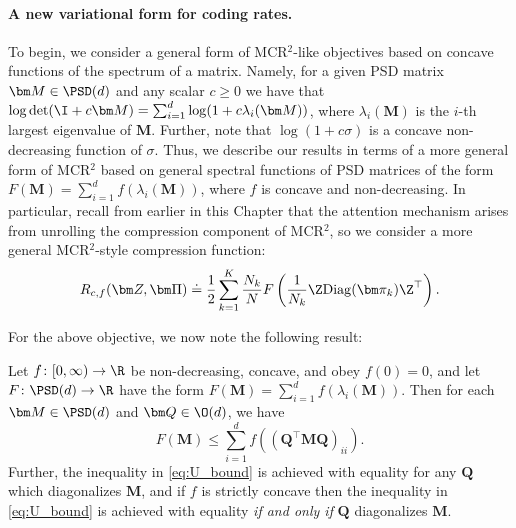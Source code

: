 \documentclass[../../book-main.tex]{subfiles}
\begin{document}
\paragraph{A new variational form for coding rates.} To begin, we
consider a general form of MCR$^2$-like objectives based on concave
functions of the spectrum of a matrix.  Namely, for a given PSD
matrix $\bm M \in \PSD(d)$ and any scalar $c \geq 0$ we have that
$\log \det (\I + c \bm M) = \sum_{i=1}^{d} \log( 1 + c \lambda_i(\bm
M))$, where $\lambda_i (\bm M)$ is the $i$-th largest eigenvalue of
$\bm M$.  Further, note that $\log(1 + c \sigma)$ is a concave
non-decreasing function of $\sigma$.  Thus, we describe our results
in terms of a more general form of MCR$^2$ based on general spectral
functions of PSD matrices of the form $F(\bm M) = \sum_{i=1}^{d}
f(\lambda_i(\bm M))$, where $f$ is concave and non-decreasing.  In
particular, recall from earlier in this Chapter that the attention
mechanism arises from unrolling the compression component of MCR$^2$,
so we consider a more general MCR$^2$-style compression function:
\begin{equation}
    R_{c,f}(\bm Z, \bm \Pi) \doteq \frac{1}{2}\sum_{k=1}^K
    \frac{N_k}{N} F\left( \frac{1}{N_k}\Z \mathrm{Diag}(\bm \pi_k)
    \Z^{\top} \right).
    \label{eq:mcr_c_gen}
\end{equation}

For the above objective, we now note the following result:
\begin{theorem}
    \label{thm:var_concave}
    Let \(f \colon [0, \infty) \to \R\) be non-decreasing, concave,
    and obey \(f(0) = 0\), and let \(F \colon \PSD(d) \to \R\) have
    the form \(F(\bm M) = \sum_{i = 1}^{d}f(\lambda_{i}(\bm M))\).
    Then for each \(\bm M \in \PSD(d)\) and \(\bm Q \in \O(d)\), we have
    \begin{equation}
        \label{eq:U_bound}
        F(\bm M) \leq  \sum_{i=1}^{d} f\left( (\bm Q^{\top} \bm M \bm
        Q)_{ii} \right).
    \end{equation}
    Further, the inequality in \eqref{eq:U_bound} is achieved with
    equality for any $\bm Q$ which diagonalizes $\bm M$, and if $f$
    is strictly concave then the inequality in \eqref{eq:U_bound} is
    achieved with equality \textit{if and only if} $\bm Q$ diagonalizes $\bm M$.
\end{theorem}
\end{document}
